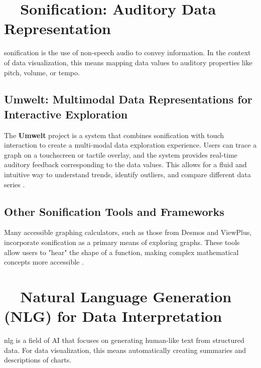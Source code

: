 \section{~~Sonification: Auditory Data Representation}\label{ch13:sec:sonification}
\gls{sonification} is the use of non-speech audio to convey information. In the context of data visualization, this means mapping data values to auditory properties like pitch, volume, or tempo.

\subsection{Umwelt: Multimodal Data Representations for Interactive Exploration}\label{ch13:ssec:umwelt}
The \textbf{Umwelt} project is a system that combines sonification with touch interaction to create a multi-modal data exploration experience. Users can trace a graph on a touchscreen or tactile overlay, and the system provides real-time auditory feedback corresponding to the data values. This allows for a fluid and intuitive way to understand trends, identify outliers, and compare different data series \supercite{Umwelt, Zong2024Umwelt}.

\subsection{Other Sonification Tools and Frameworks}\label{ch13:ssec:sonification-tools}
Many accessible graphing calculators, such as those from Desmos and ViewPlus, incorporate sonification as a primary means of exploring graphs. These tools allow users to "hear" the shape of a function, making complex mathematical concepts more accessible \supercite{Trayford2023STRAUSS, SonificationSandbox, TwoTone}.

\section{~~Natural Language Generation (NLG) for Data Interpretation}\label{ch13:sec:nlg}
\gls{nlg} is a field of \gls{AI} that focuses on generating human-like text from structured data. For data visualization, this means automatically creating summaries and descriptions of charts.

